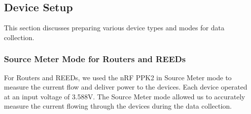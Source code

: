 \subsection{Device Setup}\label{sec:device_setup}
This section discusses preparing various device types and modes for data collection.

\subsubsection{Source Meter Mode for Routers and REEDs}\label{sec:source_meter_mode}
For Routers and REEDs, we used the nRF PPK2 in Source Meter mode to measure the current flow and deliver power to the devices. Each device operated at an input voltage of 3.588V. The Source Meter mode allowed us to accurately measure the current flowing through the devices during the data collection.

